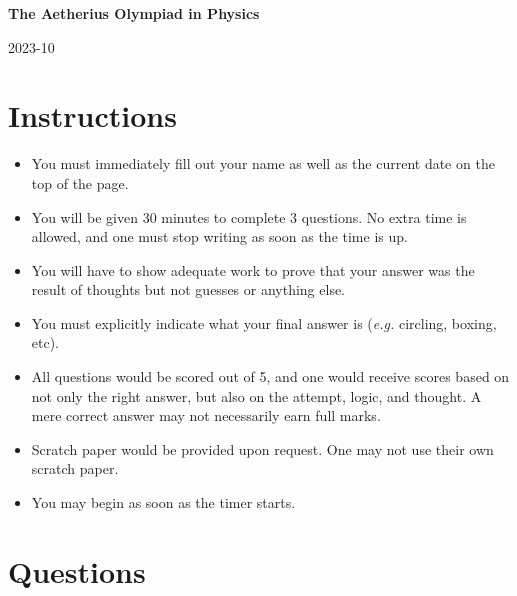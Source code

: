 \documentclass{exam}
\begin{document}
\begin{center}
    \LARGE{\textbf{The Aetherius Olympiad in Physics}}

    \vspace{8pt}

    \large{2023-10}
\end{center}

\section*{Instructions}
\begin{itemize}
    \item You must immediately fill out your name as well as the current date on the top of the page.
    \item You will be given 30 minutes to complete 3 questions. No extra time is allowed, and one must stop writing as soon as the time is up.
    \item You will have to show adequate work to prove that your answer was the result of thoughts but not guesses or anything else.
    \item You must explicitly indicate what your final answer is (\textit{e.g.} circling, boxing, etc).
    \item All questions would be scored out of 5, and one would receive scores based on not only the right answer, but also on the attempt, logic, and thought. A mere correct answer may not necessarily earn full marks.
    \item Scratch paper would be provided upon request. One may not use their own scratch paper.
    \item You may begin as soon as the timer starts.
\end{itemize}

\section*{Questions}
\end{document}
